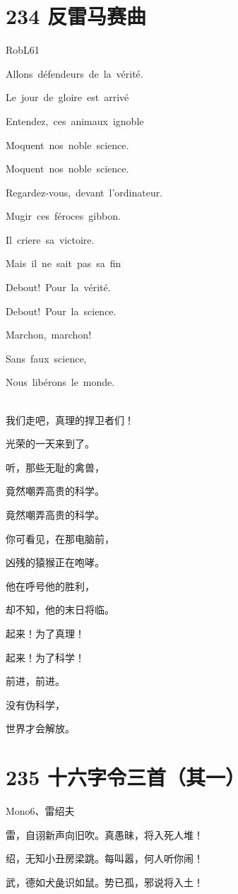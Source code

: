 \documentclass[UTF8,12pt,oneside]{ctexbook}
\def\pau#1{\begin{center} {#1} \end{center}} %
\def\poem#1#2{\section{#1}\pau{#2}} %
\begin{document}
        \poem{234 反雷马赛曲}{RobL61}
        \begin{center}
        Allons défendeurs de la vérité.

        Le jour de gloire est arrivé 

        Entendez, ces animaux ignoble

        Moquent nos noble science.

        Moquent nos noble science.

        Regardez-vous, devant l'ordinateur.

        Mugir ces féroces gibbon.

        Il criere sa victoire.

        Mais il ne sait pas sa fin

        Debout! Pour la vérité.

        Debout! Pour la science.

        Marchon, marchon!

        Sans faux science, 

        Nous libérons le monde.
        
        ~\\
        我们走吧，真理的捍卫者们！
        
        光荣的一天来到了。
        
        听，那些无耻的禽兽，
        
        竟然嘲弄高贵的科学。
        
        竟然嘲弄高贵的科学。
        
        你可看见，在那电脑前，
        
        凶残的猿猴正在咆哮。
        
        他在呼号他的胜利，
        
        却不知，他的末日将临。
        
        起来！为了真理！
        
        起来！为了科学！
        
        前进，前进。
        
        没有伪科学，
        
        世界才会解放。
        \end{center}

        \poem{235 十六字令三首（其一）}{Mono6、雷绍夫}
        \begin{center}
        雷，自诩新声向旧吹。真愚昧，将入死人堆！

        绍，无知小丑房梁跳。每叫嚣，何人听你闹！
        
        武，德如犬彘识如鼠。势已孤，邪说将入土！

        ~\\
        \end{center}
\end{document}
